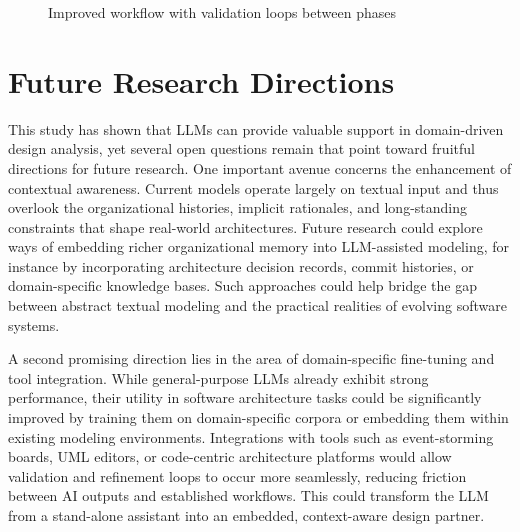 \begin{figure}[htbp]
\caption{Improved workflow with validation loops between phases}
\label{fig:improved-ddd-workflow}
\end{figure}


\section{Future Research Directions}

This study has shown that LLMs can provide valuable support in domain-driven design analysis, yet several open questions remain that point toward fruitful directions for future research. One important avenue concerns the enhancement of contextual awareness. Current models operate largely on textual input and thus overlook the organizational histories, implicit rationales, and long-standing constraints that shape real-world architectures. Future research could explore ways of embedding richer organizational memory into LLM-assisted modeling, for instance by incorporating architecture decision records, commit histories, or domain-specific knowledge bases. Such approaches could help bridge the gap between abstract textual modeling and the practical realities of evolving software systems.

A second promising direction lies in the area of domain-specific fine-tuning and tool integration. While general-purpose LLMs already exhibit strong performance, their utility in software architecture tasks could be significantly improved by training them on domain-specific corpora or embedding them within existing modeling environments. Integrations with tools such as event-storming boards, UML editors, or code-centric architecture platforms would allow validation and refinement loops to occur more seamlessly, reducing friction between AI outputs and established workflows. This could transform the LLM from a stand-alone assistant into an embedded, context-aware design partner.

